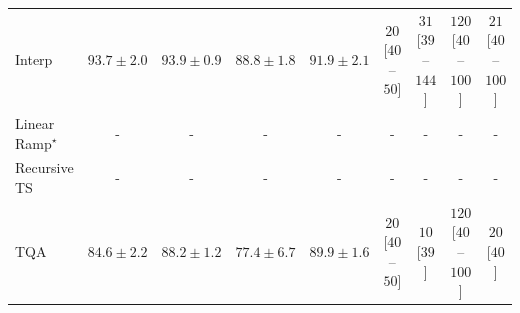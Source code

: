 \begin{tabular}{l|cccc|cccc|}
Interp & {\cellcolor[HTML]{197C40}} \color[HTML]{F1F1F1} $93.7\pm 2.0$ & {\cellcolor[HTML]{177B3F}} \color[HTML]{F1F1F1} $93.9\pm 0.9$ & {\cellcolor[HTML]{5FBA6C}} \color[HTML]{F1F1F1} $88.8\pm 1.8$ & {\cellcolor[HTML]{2F944E}} \color[HTML]{F1F1F1} $91.9\pm 2.1$ & {\cellcolor[HTML]{FFF5F1}} \color[HTML]{000000} $20$ [$40$--$50$] & {\cellcolor[HTML]{FEF1ED}} \color[HTML]{000000} $31$ [$39$--$144$] & {\cellcolor[HTML]{FDD8D5}} \color[HTML]{000000} $120$ [$40$--$100$] & {\cellcolor[HTML]{FFF4F0}} \color[HTML]{000000} $21$ [$40$--$100$] \\
Linear Ramp$^\star$ & {\cellcolor[HTML]{000000}} \color[HTML]{F1F1F1} {\cellcolor{white}} \color{black} - & {\cellcolor[HTML]{000000}} \color[HTML]{F1F1F1} {\cellcolor{white}} \color{black} - & {\cellcolor[HTML]{000000}} \color[HTML]{F1F1F1} {\cellcolor{white}} \color{black} - & {\cellcolor[HTML]{000000}} \color[HTML]{F1F1F1} {\cellcolor{white}} \color{black} - & {\cellcolor[HTML]{000000}} \color[HTML]{F1F1F1} {\cellcolor{white}} \color{black} - & {\cellcolor[HTML]{000000}} \color[HTML]{F1F1F1} {\cellcolor{white}} \color{black} - & {\cellcolor[HTML]{000000}} \color[HTML]{F1F1F1} {\cellcolor{white}} \color{black} - & {\cellcolor[HTML]{000000}} \color[HTML]{F1F1F1} {\cellcolor{white}} \color{black} - \\
Recursive TS & {\cellcolor[HTML]{000000}} \color[HTML]{F1F1F1} {\cellcolor{white}} \color{black} - & {\cellcolor[HTML]{000000}} \color[HTML]{F1F1F1} {\cellcolor{white}} \color{black} - & {\cellcolor[HTML]{000000}} \color[HTML]{F1F1F1} {\cellcolor{white}} \color{black} - & {\cellcolor[HTML]{000000}} \color[HTML]{F1F1F1} {\cellcolor{white}} \color{black} - & {\cellcolor[HTML]{000000}} \color[HTML]{F1F1F1} {\cellcolor{white}} \color{black} - & {\cellcolor[HTML]{000000}} \color[HTML]{F1F1F1} {\cellcolor{white}} \color{black} - & {\cellcolor[HTML]{000000}} \color[HTML]{F1F1F1} {\cellcolor{white}} \color{black} - & {\cellcolor[HTML]{000000}} \color[HTML]{F1F1F1} {\cellcolor{white}} \color{black} - \\
TQA & {\cellcolor[HTML]{B2DF90}} \color[HTML]{000000} $84.6\pm 2.2$ & {\cellcolor[HTML]{6BC072}} \color[HTML]{000000} $88.2\pm 1.2$ & {\cellcolor[HTML]{FDFEDB}} \color[HTML]{000000} $77.4\pm 6.7$ & {\cellcolor[HTML]{49AF61}} \color[HTML]{F1F1F1} $89.9\pm 1.6$ & {\cellcolor[HTML]{FFF5F1}} \color[HTML]{000000} $20$ [$40$--$50$] & {\cellcolor[HTML]{FFF7F3}} \color[HTML]{000000} $10$ [$39$] & {\cellcolor[HTML]{FDD8D5}} \color[HTML]{000000} $120$ [$40$--$100$] & {\cellcolor[HTML]{FFF5F1}} \color[HTML]{000000} $20$ [$40$] \\

\end{tabular}
